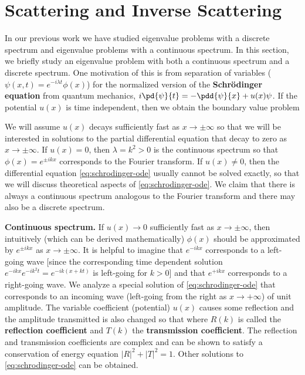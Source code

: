 \section{Scattering and Inverse Scattering}
\label{sec:scattering}

In our previous work we have studied eigenvalue problems with a discrete spectrum and eigenvalue problems with a continuous spectrum.  In this section, we briefly study an eigenvalue problem with both a continuous spectrum and a discrete spectrum.  One motivation of this is from separation of variables ($\psi(x,t) = e^{-i\lambda t}\phi(x)$) for the normalized version of the \textbf{Schr\"odinger equation} from quantum mechanics, $i\pd{\psi}{t} = -\pdd{\psi}{x} + u(x)\psi$.  If the potential $u(x)$ is time independent, then we obtain the boundary value problem

We will assume $u(x)$ decays sufficiently fast as $x \to \pm\infty$ so that we will be interested in solutions to the partial differential equation that decay to zero as $x \to \pm\infty$.  If $u(x) = 0$, then $\lambda = k^2 > 0$ is the continuous spectrum so that $\phi(x) = e^{\pm ikx}$ corresponds to the Fourier transform.  If $u(x) \ne 0$, then the differential equation \eqref{eq:schrodinger-ode} usually cannot be solved exactly, so that we will discuss theoretical aspects of \eqref{eq:schrodinger-ode}.  We claim that there is always a continuous spectrum analogous to the Fourier transform and there may also be a discrete spectrum.

\textbf{Continuous spectrum.}  If $u(x) \to 0$ sufficiently fast as $x \to \pm\infty$, then intuitively (which can be derived mathematically) $\phi(x)$ should be approximated by $e^{\pm ikx}$ as $x \to \pm\infty$.  It is helpful to imagine that $e^{-ikx}$ corresponds to a left-going wave [since the corresponding time dependent solution $e^{-ikx}e^{-ik^2 t} = e^{-ik(x+kt)}$ is left-going for $k > 0$] and that $e^{+ikx}$ corresponds to a right-going wave.  We analyze a special solution of \eqref{eq:schrodinger-ode} that corresponds to an incoming wave (left-going from the right as $x \to +\infty$) of unit amplitude.  The variable coefficient (potential) $u(x)$ causes some reflection and the amplitude transmitted is also changed so that
where $R(k)$ is called the \textbf{reflection coefficient} and $T(k)$ the \textbf{transmission coefficient}.  The reflection and transmission coefficients are complex and can be shown to satisfy a conservation of energy equation $|R|^2 + |T|^2 = 1$.  Other solutions to \eqref{eq:schrodinger-ode} can be obtained.

